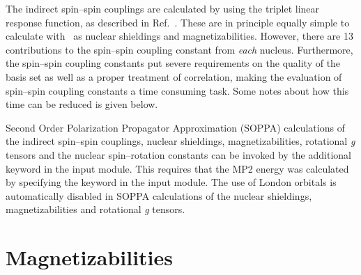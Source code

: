 The indirect spin--spin couplings are calculated by using the triplet linear
response function, as described in
Ref.~\cite{ovhapjhjajsbpthjcp96}.
These are in principle equally simple to calculate with \siraba\ as
nuclear shieldings and magnetizabilities. However, there are 13
contributions to the spin--spin coupling constant from {\em each}
nucleus. Furthermore, the spin--spin coupling constants put severe
requirements on the quality of the basis set as well as a proper
treatment of correlation, making the evaluation of spin--spin coupling
constants a time consuming task. Some notes about how this time
can be reduced is given below.

Second Order Polarization Propagator Approximation (SOPPA)  
 calculations 
\cite{esnpjjodjcp73,jopjdycpr2,mjpekdtehjajjojcp,spascpl260,tejospastcan100} 
of the indirect spin--spin couplings, nuclear shieldings, magnetizabilities, 
rotational {\em g} tensors and the nuclear spin--rotation constants can
be invoked by the additional keyword  in the  
input module. This requires that the MP2 energy was calculated by specifying 
the keyword  in the  input module. The use of 
London orbitals is automatically disabled in SOPPA calculations of the nuclear
shieldings, magnetizabilities and rotational {\em g} tensors.

\section{Magnetizabilities}\label{sec:magnetizability}

\begin{center}
\end{center}


